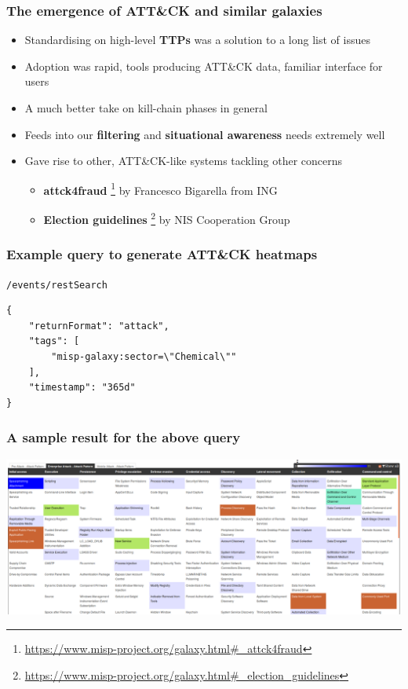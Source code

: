 \begin{frame}
  \frametitle{The emergence of ATT\&CK and similar galaxies}
  \begin{itemize}
    \item Standardising on high-level {\bf TTPs} was a solution to a long list of issues
    \item Adoption was rapid, tools producing ATT\&CK data, familiar interface for users
    \item A much better take on kill-chain phases in general
    \item Feeds into our {\bf filtering} and {\bf situational awareness} needs extremely well
    \item Gave rise to other, ATT\&CK-like systems tackling other concerns
    \begin{itemize}
      \item {\bf attck4fraud} \footnote{\url{https://www.misp-project.org/galaxy.html\#_attck4fraud}} by Francesco Bigarella from ING
      \item {\bf Election guidelines} \footnote{\url{https://www.misp-project.org/galaxy.html\#_election_guidelines}} by NIS Cooperation Group
    \end{itemize}
  \end{itemize}
\end{frame}

\begin{frame}[fragile]
    \frametitle{Example query to generate ATT\&CK heatmaps}
    \texttt{/events/restSearch}
    \begin{lstlisting}
{
    "returnFormat": "attack",
    "tags": [
        "misp-galaxy:sector=\"Chemical\""
    ],
    "timestamp": "365d"
}
    \end{lstlisting}
\end{frame}

\begin{frame}
  \frametitle{A sample result for the above query}
  \begin{center}
    \includegraphics[scale=0.2]{attack-screenshot.png}
  \end{center}
\end{frame}

